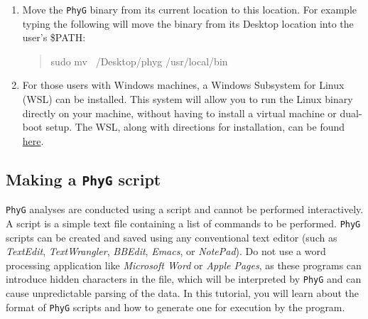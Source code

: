 \documentclass[11pt]{article}
\newcommand{\phyg}{\texttt{PhyG} }
\begin{document}
\begin{enumerate}
	\begin{quote}
  	/Applications/phyg ~/Desktop/phygfiles/run1.pg
	\end{quote}
	
see also below \ref{subsec:executing})
	
\item Move the \phyg binary from its current location to this location. For example 
typing the following will move the binary from its Desktop location into the user's 
\$PATH:

	\begin{quote}
	sudo mv ~/Desktop/phyg /usr/local/bin
	\end{quote}	
	
\item For those users with Windows machines, a Windows Subsystem for Linux 
(WSL) can be installed. This system will allow you to run the Linux binary directly 
on your machine, without having to install a virtual machine or dual-boot setup. 
The WSL, along with directions for installation, can be found 
\href{https://learn.microsoft.com/en-us/windows/wsl/}{here}.
\end{enumerate}

\subsection{Making a \phyg script}
\label{subsec:Scripts}

\phyg analyses are conducted using a script and cannot be performed interactively. 
A script is a simple text file containing a list of commands to be performed. \phyg 
scripts can be created and saved using any conventional text editor (such as 
\textit{TextEdit}, \textit{TextWrangler}, \textit{BBEdit}, \textit{Emacs}, or \textit{NotePad}). 
Do not use a word processing application like \textit{Microsoft Word} or \textit{Apple 
Pages}, as these programs can introduce hidden characters in the file, which will be 
interpreted by \phyg and can cause unpredictable parsing of the data. In this tutorial, 
you will learn about the format of \phyg scripts and how to generate one for execution 
by the program.
\end{document}
